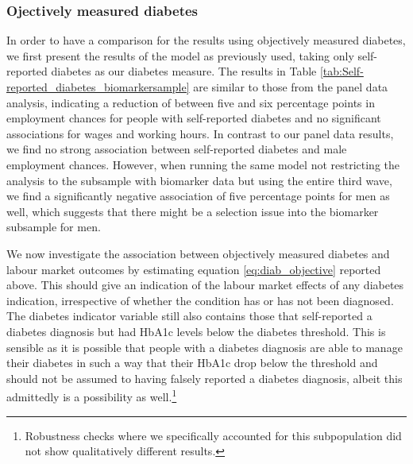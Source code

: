 \subsubsection*{Ojectively measured diabetes}

In order to have a comparison for the results using objectively measured
diabetes, we first present the results of the model as previously
used, taking only self-reported diabetes as our diabetes measure.
The results in Table \ref{tab:Self-reported_diabetes_biomarkersample}
are similar to those from the panel data analysis, indicating a reduction
of between five and six percentage points in employment chances for
people with self-reported diabetes and no significant associations
for wages and working hours. In contrast to our panel data results,
we find no strong association between self-reported diabetes and male
employment chances. However, when running the same model not restricting the analysis to the subsample with biomarker data but using the
entire third wave, we find a significantly negative association of
five percentage points for men as well, which suggests that there
might be a selection issue into the biomarker subsample for men.

We now investigate the association between objectively measured
diabetes and labour market outcomes by estimating equation \ref{eq:diab_objective}
reported above. This should give an indication of the labour
market effects of any diabetes indication, irrespective of whether
the condition has or has not been diagnosed. The diabetes indicator
variable still also contains those that self-reported a diabetes diagnosis
but had \ac{HbA1c} levels below the diabetes threshold. This is sensible as it is possible that people with a diabetes diagnosis are able to manage their diabetes in such a way that their \ac{HbA1c} drop below the threshold and should not be assumed to having falsely reported a diabetes diagnosis, albeit this admittedly is a possibility as well.\footnote{Robustness checks where we specifically accounted for this subpopulation
did not show qualitatively different results.} 

